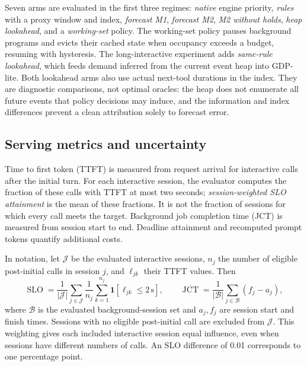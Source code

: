 \documentclass[11pt,a4paper]{article}
\begin{document}
Seven arms are evaluated in the first three regimes: \emph{native} engine priority, \emph{rules} with a proxy window and index, \emph{forecast M1}, \emph{forecast M2}, \emph{M2 without holds}, \emph{heap lookahead}, and a \emph{working-set} policy. The working-set policy pauses background programs and evicts their cached state when occupancy exceeds a budget, resuming with hysteresis. The long-interactive experiment adds \emph{same-rule lookahead}, which feeds demand inferred from the current event heap into GDP-lite. Both lookahead arms also use actual next-tool durations in the index. They are diagnostic comparisons, not optimal oracles: the heap does not enumerate all future events that policy decisions may induce, and the information and index differences prevent a clean attribution solely to forecast error.


\subsection{Serving metrics and uncertainty}
\label{sec:5.4}
Time to first token (TTFT) is measured from request arrival for interactive calls after the initial turn. For each interactive session, the evaluator computes the fraction of these calls with TTFT at most two seconds; \emph{session-weighted SLO attainment} is the mean of these fractions. It is not the fraction of sessions for which every call meets the target. Background job completion time (JCT) is measured from session start to end. Deadline attainment and recomputed prompt tokens quantify additional costs.

In notation, let \(\mathcal J\) be the evaluated interactive sessions, \(n_j\) the number of eligible post-initial calls in session \(j\), and \(\ell_{jk}\) their TTFT values. Then
\begin{equation}
\operatorname{SLO}=\frac{1}{|\mathcal J|}\sum_{j\in\mathcal J}\frac{1}{n_j}
\sum_{k=1}^{n_j}\mathbf{1}[\ell_{jk}\le2\,\mathrm{s}],\qquad
\overline{\operatorname{JCT}}=\frac{1}{|\mathcal B|}\sum_{j\in\mathcal B}(f_j-a_j),
\label{eq:serving-metrics}
\end{equation}
where \(\mathcal B\) is the evaluated background-session set and \(a_j,f_j\) are session start and finish times. Sessions with no eligible post-initial call are excluded from \(\mathcal J\). This weighting gives each included interactive session equal influence, even when sessions have different numbers of calls. An SLO difference of 0.01 corresponds to one percentage point.
\end{document}
